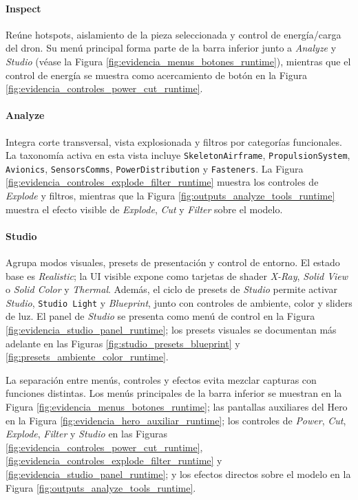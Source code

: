 \paragraph{Inspect} Reúne hotspots, aislamiento de la pieza seleccionada y control de energía/carga del dron. Su menú principal forma parte de la barra inferior junto a \textit{Analyze} y \textit{Studio} (véase la Figura \ref{fig:evidencia_menus_botones_runtime}), mientras que el control de energía se muestra como acercamiento de botón en la Figura \ref{fig:evidencia_controles_power_cut_runtime}.

\paragraph{Analyze} Integra corte transversal, vista explosionada y filtros por categorías funcionales. La taxonomía activa en esta vista incluye \texttt{SkeletonAirframe}, \texttt{PropulsionSystem}, \texttt{Avionics}, \texttt{SensorsComms}, \texttt{PowerDistribution} y \texttt{Fasteners}. La Figura \ref{fig:evidencia_controles_explode_filter_runtime} muestra los controles de \textit{Explode} y filtros, mientras que la Figura \ref{fig:outputs_analyze_tools_runtime} muestra el efecto visible de \textit{Explode}, \textit{Cut} y \textit{Filter} sobre el modelo.

\paragraph{Studio} Agrupa modos visuales, presets de presentación y control de entorno. El estado base es \textit{Realistic}; la UI visible expone como tarjetas de shader \textit{X-Ray}, \textit{Solid View} o \textit{Solid Color} y \textit{Thermal}. Además, el ciclo de presets de \textit{Studio} permite activar \textit{Studio}, \texttt{Studio Light} y \textit{Blueprint}, junto con controles de ambiente, color y sliders de luz. El panel de \textit{Studio} se presenta como menú de control en la Figura \ref{fig:evidencia_studio_panel_runtime}; los presets visuales se documentan más adelante en las Figuras \ref{fig:studio_presets_blueprint} y \ref{fig:presets_ambiente_color_runtime}.

La separación entre menús, controles y efectos evita mezclar capturas con funciones distintas. Los menús principales de la barra inferior se muestran en la Figura \ref{fig:evidencia_menus_botones_runtime}; las pantallas auxiliares del Hero en la Figura \ref{fig:evidencia_hero_auxiliar_runtime}; los controles de \textit{Power}, \textit{Cut}, \textit{Explode}, \textit{Filter} y \textit{Studio} en las Figuras \ref{fig:evidencia_controles_power_cut_runtime}, \ref{fig:evidencia_controles_explode_filter_runtime} y \ref{fig:evidencia_studio_panel_runtime}; y los efectos directos sobre el modelo en la Figura \ref{fig:outputs_analyze_tools_runtime}.

